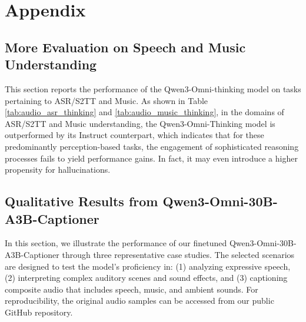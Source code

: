 \section{Appendix}
\label{sec:appendix}

\subsection{More Evaluation on Speech and Music Understanding}
\label{sec:audio-eval}

This section reports the performance of the Qwen3-Omni-thinking model on tasks pertaining to ASR/S2TT and Music. 
As shown in Table \ref{tab:audio_asr_thinking} and \ref{tab:audio_music_thinking}, in the domains of ASR/S2TT and Music understanding, the Qwen3-Omni-Thinking model is outperformed by its Instruct counterpart, which indicates that for these predominantly perception-based tasks, the engagement of sophisticated reasoning processes fails to yield performance gains. In fact, it may even introduce a higher propensity for hallucinations.







\subsection{Qualitative Results from Qwen3-Omni-30B-A3B-Captioner}
\label{sec:caption-case}

In this section, we illustrate the performance of our finetuned Qwen3-Omni-30B-A3B-Captioner through three representative case studies. The selected scenarios are designed to test the model's proficiency in: (1) analyzing expressive speech, (2) interpreting complex auditory scenes and sound effects, and (3) captioning composite audio that includes speech, music, and ambient sounds. For reproducibility, the original audio samples can be accessed from our public GitHub repository.



